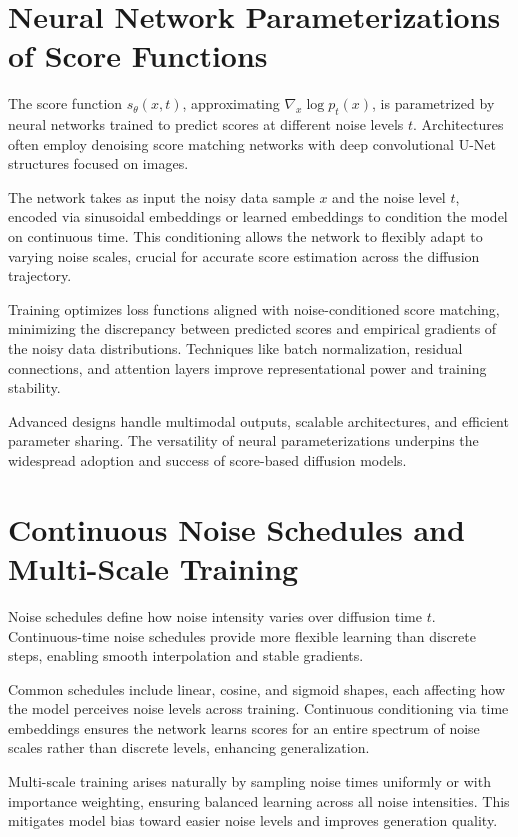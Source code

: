 \section{Neural Network Parameterizations of Score Functions}

The score function \( s_\theta(x,t) \), approximating \( \nabla_x \log p_t(x) \), is parametrized by neural networks trained to predict scores at different noise levels \( t \). Architectures often employ denoising score matching networks with deep convolutional U-Net structures focused on images.

The network takes as input the noisy data sample \( x \) and the noise level \( t \), encoded via sinusoidal embeddings or learned embeddings to condition the model on continuous time. This conditioning allows the network to flexibly adapt to varying noise scales, crucial for accurate score estimation across the diffusion trajectory.

Training optimizes loss functions aligned with noise-conditioned score matching, minimizing the discrepancy between predicted scores and empirical gradients of the noisy data distributions. Techniques like batch normalization, residual connections, and attention layers improve representational power and training stability.

Advanced designs handle multimodal outputs, scalable architectures, and efficient parameter sharing. The versatility of neural parameterizations underpins the widespread adoption and success of score-based diffusion models.

\section{Continuous Noise Schedules and Multi-Scale Training}

Noise schedules define how noise intensity varies over diffusion time \( t \). Continuous-time noise schedules provide more flexible learning than discrete steps, enabling smooth interpolation and stable gradients.

Common schedules include linear, cosine, and sigmoid shapes, each affecting how the model perceives noise levels across training. Continuous conditioning via time embeddings ensures the network learns scores for an entire spectrum of noise scales rather than discrete levels, enhancing generalization.

Multi-scale training arises naturally by sampling noise times uniformly or with importance weighting, ensuring balanced learning across all noise intensities. This mitigates model bias toward easier noise levels and improves generation quality.

